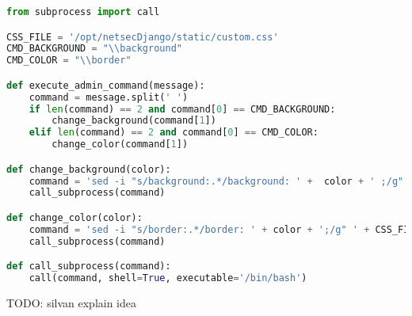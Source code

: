 \documentclass[12pt,a4paper]{article}
\begin{document}
\begin{lstlisting}[language=python]
from subprocess import call

CSS_FILE = '/opt/netsecDjango/static/custom.css'
CMD_BACKGROUND = "\\background"
CMD_COLOR = "\\border"

def execute_admin_command(message):
    command = message.split(' ')
    if len(command) == 2 and command[0] == CMD_BACKGROUND:
        change_background(command[1])
    elif len(command) == 2 and command[0] == CMD_COLOR:
        change_color(command[1])

def change_background(color):
    command = 'sed -i "s/background:.*/background: ' +  color + ' ;/g" ' + CSS_FILE
    call_subprocess(command)

def change_color(color):
    command = 'sed -i "s/border:.*/border: ' + color + ';/g" ' + CSS_FILE
    call_subprocess(command)

def call_subprocess(command):
    call(command, shell=True, executable='/bin/bash')


\end{lstlisting}
TODO: silvan explain idea
\end{document}

